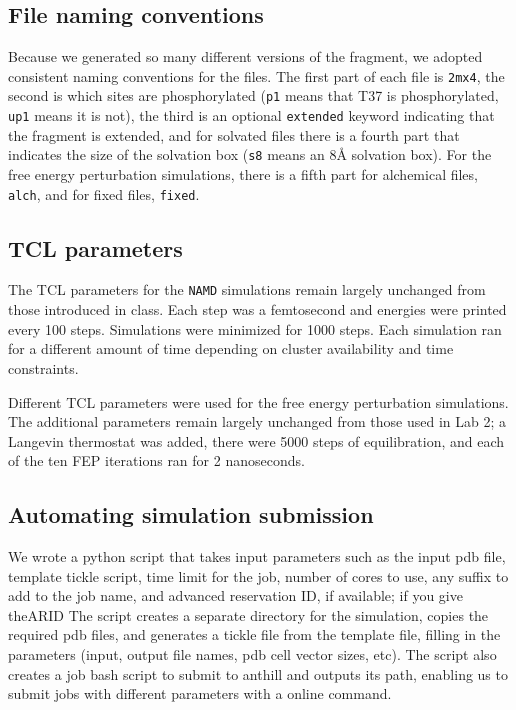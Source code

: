 \subsection{File naming conventions}
Because we generated so many different versions of the fragment, we adopted consistent naming conventions for the files.
The first part of each file is \texttt{2mx4},
the second is which sites are phosphorylated (\texttt{p1} means that T37 is phosphorylated, \texttt{up1} means it is not),
the third is an optional \texttt{extended} keyword indicating that the fragment is extended,
and for solvated files there is a fourth part that indicates the size of the solvation box (\texttt{s8} means an 8{\AA} solvation box).
For the free energy perturbation simulations, there is a fifth part for alchemical files, \texttt{alch}, and for fixed files, \texttt{fixed}.

\subsection{TCL parameters}
The TCL parameters for the \texttt{NAMD} simulations remain largely unchanged from those introduced in class.
Each step was a femtosecond and energies were printed every 100 steps.
Simulations were minimized for 1000 steps.
Each simulation ran for a different amount of time depending on cluster availability and time constraints.

Different TCL parameters were used for the free energy perturbation simulations.
The additional parameters remain largely unchanged from those used in Lab 2;
a Langevin thermostat was added, there were 5000 steps of equilibration, and each of the ten FEP iterations ran for 2 nanoseconds.


\subsection{Automating simulation submission} %
\label{sub:automating_simulation_submission}

We wrote a python script that takes input parameters such as the input pdb file, template tickle script, time limit for the job, number of cores to use, any suffix to add to the job name, and advanced reservation ID, if available; if you give theARID
The script creates a separate directory for the simulation, copies the required pdb files, and generates a tickle file from the template file, filling in the parameters (input, output file names, pdb cell vector sizes, etc).
The script also creates a job bash script to submit to anthill and outputs its path, enabling us to submit jobs with different parameters with a online command.

